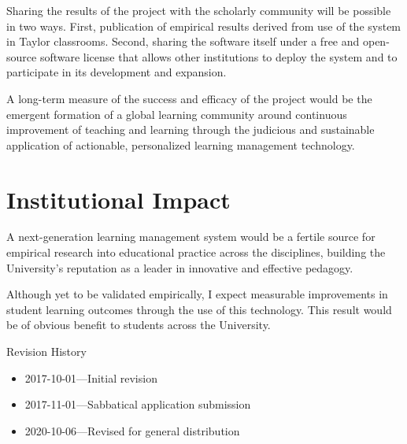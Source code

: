\documentclass{article}
\begin{document}
Sharing the results of the project with the scholarly community
will be possible in two ways.
First, publication of empirical results
derived from use of the system in Taylor classrooms.
Second, sharing the software itself
under a free and open-source software license
that allows other institutions
to deploy the system and
to participate in its development and expansion.

A long-term measure of the success and efficacy
of the project would be the emergent formation
of a global learning community
around continuous improvement of teaching and learning
through the judicious and sustainable application
of actionable, personalized learning management technology.

\section{Institutional Impact}
\label{sec:institutional-impact}

A next-generation learning management system would be a fertile source for
empirical research into educational practice across the disciplines, building
the University's reputation as a leader in innovative and effective pedagogy.

Although yet to be validated empirically, I expect measurable improvements in
student learning outcomes through the use of this technology. This result would
be of obvious benefit to students across the University.

\vfill
\begin{flushleft}
  \small
  Revision History
  \begin{itemize}
  \item 2017-10-01---Initial revision
  \item 2017-11-01---Sabbatical application submission
  \item 2020-10-06---Revised for general distribution
  \end{itemize}
\end{flushleft}
\end{document}
